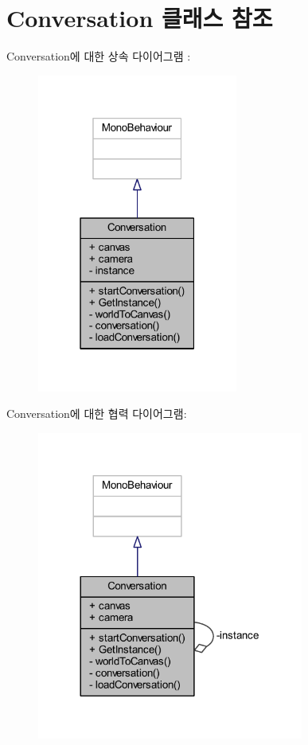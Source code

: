 \hypertarget{class_conversation}{}\section{Conversation 클래스 참조}
\label{class_conversation}


Conversation에 대한 상속 다이어그램 \+: \nopagebreak
\begin{figure}[H]
\begin{center}
\leavevmode
\includegraphics[width=187pt]{dc/d8a/class_conversation__inherit__graph}
\end{center}
\end{figure}


Conversation에 대한 협력 다이어그램\+:\nopagebreak
\begin{figure}[H]
\begin{center}
\leavevmode
\includegraphics[width=248pt]{d8/d54/class_conversation__coll__graph}
\end{center}
\end{figure}

